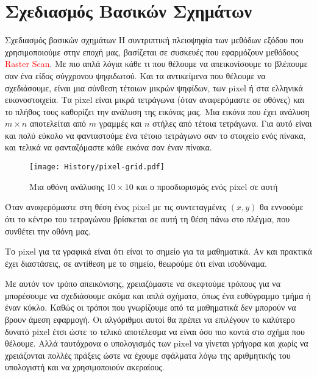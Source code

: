 \chapter{Σχεδιασμός Βασικών Σχημάτων}


Σχεδιασμός βασικών σχημάτων
Η συντριπτική πλειοψηφία των μεθόδων εξόδου που χρησιμοποιούμε στην εποχή μας, βασίζεται σε συσκευές που εφαρμόζουν μεθόδους \textcolor{red}{Raster Scan}. Με πιο απλά λόγια κάθε τι που θέλουμε να απεικονίσουμε το βλέπουμε σαν ένα είδος σύγχρονου ψηφιδωτού. Και τα αντικείμενα που θέλουμε να σχεδιάσουμε, είναι μια σύνθεση τέτοιων μικρών ψηφίδων, των pixel ή στα ελληνικά εικονοστοιχεία.
Τα pixel είναι μικρά τετράγωνα (όταν αναφερόμαστε σε οθόνες) και το πλήθος τους καθορίζει την ανάλυση της εικόνας μας. Μια εικόνα που έχει ανάλυση $m \times n$ αποτελείται από $m$ γραμμές και $n$ στήλες από τέτοια τετράγωνα. Για αυτό είναι και πολύ εύκολο να φανταστούμε ένα τέτοιο τετράγωνο σαν το στοιχείο ενός πίνακα, και τελικά να φανταζόμαστε κάθε εικόνα σαν έναν πίνακα.
%
\begin{figure}
  \begin{center}
	\texttt{[image: History/pixel-grid.pdf]}
  \end{center}
  \caption{Μια οθόνη ανάλυσης $10\times 10$ και ο προσδιορισμός ενός pixel σε αυτή}
\end{figure}

\begin{definition}
	Όταν αναφερόμαστε στη θέση ένος pixel με τις συντεταγμένες $(x,y)$ θα εννοούμε ότι το κέντρο του τετραγώνου βρίσκεται σε αυτή τη θέση πάνω στο πλέγμα, που συνθέτει την οθόνη μας.	
\end{definition}
%
\begin{remark}
	Το pixel για τα γραφικά είναι ότι είναι το σημείο για τα μαθηματικά. Αν και πρακτικά έχει διαστάσεις, σε αντίθεση με το σημείο, θεωρούμε ότι είναι ισοδύναμα.
\end{remark}
%
Με αυτόν τον τρόπο απεικόνισης, χρειαζόμαστε να σκεφτούμε τρόπους για να μπορέσουμε να σχεδιάσουμε ακόμα και απλά σχήματα, όπως ένα ευθύγραμμο τμήμα ή έναν κύκλο. Καθώς οι τρόποι που γνωρίζουμε από τα μαθηματικά δεν μπορούν να βρουν άμεση εφαρμογή.
Οι αλγόριθμοι αυτοί θα πρέπει να επιλέγουν το καλύτερο δυνατό pixel έτσι ώστε το τελικό αποτέλεσμα να είναι όσο πιο κοντά στο σχήμα που θέλουμε. Αλλά ταυτόχρονα ο υπολογισμός των pixel να γίνεται γρήγορα και χωρίς να χρειάζονται πολλές πράξεις ώστε να έχουμε σφάλματα λόγω της αριθμητικής του υπολογιστή και να χρησιμοποιούν ακεραίους.

